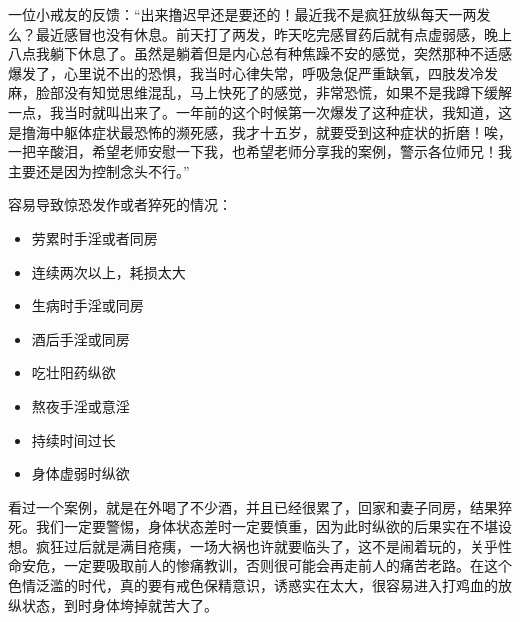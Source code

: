 \begin{case}
    一位小戒友的反馈：“出来撸迟早还是要还的！最近我不是疯狂放纵每天一两发么？最近感冒也没有休息。前天打了两发，昨天吃完感冒药后就有点虚弱感，晚上八点我躺下休息了。虽然是躺着但是内心总有种焦躁不安的感觉，突然那种不适感爆发了，心里说不出的恐惧，我当时心律失常，呼吸急促严重缺氧，四肢发冷发麻，脸部没有知觉思维混乱，马上快死了的感觉，非常恐慌，如果不是我蹲下缓解一点，我当时就叫出来了。一年前的这个时候第一次爆发了这种症状，我知道，这是撸海中躯体症状最恐怖的濒死感，我才十五岁，就要受到这种症状的折磨！唉，一把辛酸泪，希望老师安慰一下我，也希望老师分享我的案例，警示各位师兄！我主要还是因为控制念头不行。”

    容易导致惊恐发作或者猝死的情况：\begin{multicols}{2}
        \begin{itemize}
            \item 劳累时手淫或者同房
            \item 连续两次以上，耗损太大
            \item 生病时手淫或同房
            \item 酒后手淫或同房
            \item 吃壮阳药纵欲
            \item 熬夜手淫或意淫
            \item 持续时间过长
            \item 身体虚弱时纵欲
        \end{itemize}
    \end{multicols}

    看过一个案例，就是在外喝了不少酒，并且已经很累了，回家和妻子同房，结果猝死。我们一定要警惕，身体状态差时一定要慎重，因为此时纵欲的后果实在不堪设想。疯狂过后就是满目疮痍，一场大祸也许就要临头了，这不是闹着玩的，关乎性命安危，一定要吸取前人的惨痛教训，否则很可能会再走前人的痛苦老路。在这个色情泛滥的时代，真的要有戒色保精意识，诱惑实在太大，很容易进入打鸡血的放纵状态，到时身体垮掉就苦大了。
\end{case}


